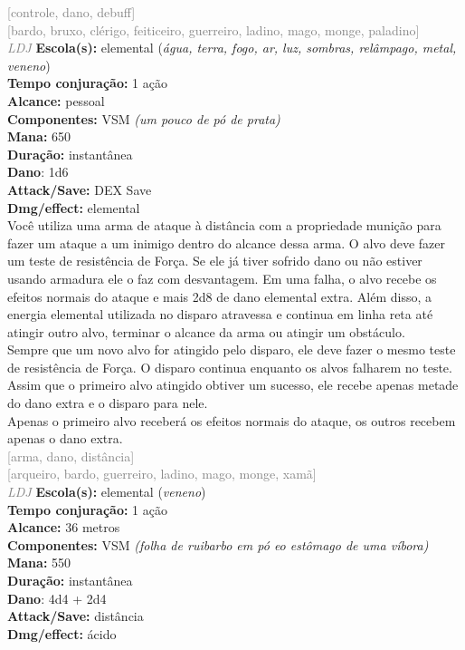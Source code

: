 \documentclass{RPG_Adventure}[2021/10/20]
\begin{document}
{\scriptsize \textcolor{gray}{[controle, dano, debuff]\\}}
{\scriptsize \textcolor{gray}{[bardo, bruxo, clérigo, feiticeiro, guerreiro, ladino, mago, monge, paladino]\\}}
{\tiny \textcolor{gray}{\textit{LDJ}}}
{\small \t \textbf{Escola(s):} elemental (\textit{água, terra, fogo, ar, luz, sombras, relâmpago, metal, veneno})\\\t \textbf{Tempo conjuração:} 1 ação\\\t \textbf{Alcance:} pessoal\\\t \textbf{Componentes:} VSM \textit{(um pouco de pó de prata)}\\\t \textbf{Mana:} 650\\\t \textbf{Duração:} instantânea\\\t \textbf{Dano}: 1d6\\\t \textbf{Attack/Save:} DEX Save\\\t \textbf{Dmg/effect:} elemental\\}
{\normalsize Você utiliza uma arma de ataque à distância com a propriedade munição para fazer um ataque a um inimigo dentro do alcance dessa arma. O alvo deve fazer um teste de resistência de Força. Se ele já tiver sofrido dano ou não estiver usando armadura ele o faz com desvantagem. Em uma falha, o alvo recebe os efeitos normais do ataque e mais 2d8 de dano elemental extra. Além disso, a energia elemental utilizada no disparo atravessa e continua em linha reta até atingir outro alvo, terminar o alcance da arma ou atingir um obstáculo.\\Sempre que um novo alvo for atingido pelo disparo, ele deve fazer o mesmo teste de resistência de Força. O disparo continua enquanto os alvos falharem no teste. Assim que o primeiro alvo atingido obtiver um sucesso, ele recebe apenas metade do dano extra e o disparo para nele.\\Apenas o primeiro alvo receberá os efeitos normais do ataque, os outros recebem apenas o dano extra.\\}
{\scriptsize \textcolor{gray}{[arma, dano, distância]\\}}
{\scriptsize \textcolor{gray}{[arqueiro, bardo, guerreiro, ladino, mago, monge, xamã]\\}}
{\tiny \textcolor{gray}{\textit{LDJ}}}
{\small \t \textbf{Escola(s):} elemental (\textit{veneno})\\\t \textbf{Tempo conjuração:} 1 ação\\\t \textbf{Alcance:} 36 metros\\\t \textbf{Componentes:} VSM \textit{(folha de ruibarbo em pó eo estômago de uma víbora)}\\\t \textbf{Mana:} 550\\\t \textbf{Duração:} instantânea\\\t \textbf{Dano}: 4d4 + 2d4\\\t \textbf{Attack/Save:} distância\\\t \textbf{Dmg/effect:} ácido\\}
\end{document}
